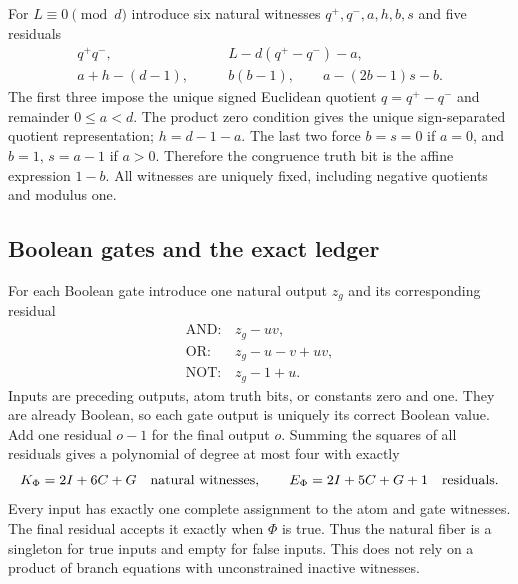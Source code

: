 \documentclass[11pt,letterpaper]{article}
\numberwithin{equation}{section}
\theoremstyle{definition}
\theoremstyle{remark}
\begin{document}
For $L\equiv0\pmod d$ introduce six natural witnesses $q^+,q^-,a,h,b,s$ and five residuals
\begin{align}
 q^+q^-,&\qquad L-d(q^+-q^-)-a,\nonumber\\
 a+h-(d-1),&\qquad b(b-1),\qquad a-(2b-1)s-b.\label{smc:sl:eq:congruence}
\end{align}
The first three impose the unique signed Euclidean quotient $q=q^+-q^-$ and remainder $0\le a<d$. The product zero condition gives the unique sign-separated quotient representation; $h=d-1-a$. The last two force $b=s=0$ if $a=0$, and $b=1$, $s=a-1$ if $a>0$. Therefore the congruence truth bit is the affine expression $1-b$. All witnesses are uniquely fixed, including negative quotients and modulus one.

\subsection{Boolean gates and the exact ledger}
For each Boolean gate introduce one natural output $z_g$ and its corresponding residual
\[
 \begin{array}{ll}
 \mathrm{AND}:&z_g-uv,\\
 \mathrm{OR}:&z_g-u-v+uv,\\
 \mathrm{NOT}:&z_g-1+u.
 \end{array}
\]
Inputs are preceding outputs, atom truth bits, or constants zero and one. They are already Boolean, so each gate output is uniquely its correct Boolean value. Add one residual $o-1$ for the final output $o$. Summing the squares of all residuals gives a polynomial of degree at most four with exactly
\begin{equation}\label{smc:sl:eq:presburger-counts}
 K_{\Phi}=2I+6C+G\quad\hbox{natural witnesses},\qquad
 E_{\Phi}=2I+5C+G+1\quad\hbox{residuals}.
\end{equation}
Every input has exactly one complete assignment to the atom and gate witnesses. The final residual accepts it exactly when $\Phi$ is true. Thus the natural fiber is a singleton for true inputs and empty for false inputs. This does not rely on a product of branch equations with unconstrained inactive witnesses.
\end{document}
